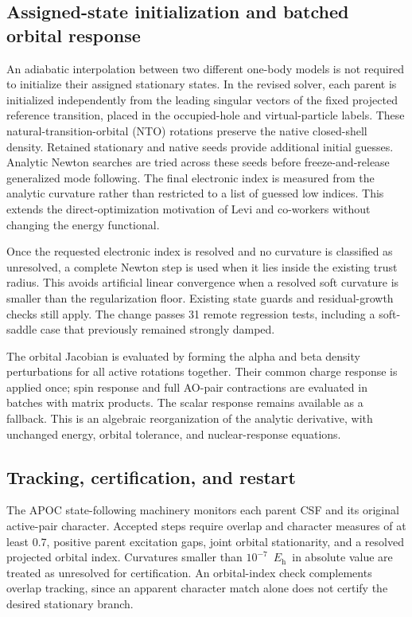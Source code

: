 \documentclass[11pt,a4paper]{article}
\newcommand{\Eh}{\ensuremath{E_{\mathrm h}}}
\begin{document}
\subsection{Assigned-state initialization and batched orbital response}
An adiabatic interpolation between two different one-body models is not required to initialize their assigned stationary states. In the revised solver, each parent is initialized independently from the leading singular vectors of the fixed projected reference transition, placed in the occupied-hole and virtual-particle labels. These natural-transition-orbital (NTO) rotations preserve the native closed-shell density. Retained stationary and native seeds provide additional initial guesses. Analytic Newton searches are tried across these seeds before freeze-and-release generalized mode following. The final electronic index is measured from the analytic curvature rather than restricted to a list of guessed low indices. This extends the direct-optimization motivation of Levi and co-workers without changing the energy functional.\cite{levi2020,gmf2023,freeze2026}

Once the requested electronic index is resolved and no curvature is classified as unresolved, a complete Newton step is used when it lies inside the existing trust radius. This avoids artificial linear convergence when a resolved soft curvature is smaller than the regularization floor. Existing state guards and residual-growth checks still apply. The change passes 31 remote regression tests, including a soft-saddle case that previously remained strongly damped.

The orbital Jacobian is evaluated by forming the alpha and beta density perturbations for all active rotations together. Their common charge response is applied once; spin response and full AO-pair contractions are evaluated in batches with matrix products. The scalar response remains available as a fallback. This is an algebraic reorganization of the analytic derivative, with unchanged energy, orbital tolerance, and nuclear-response equations.


\subsection{Tracking, certification, and restart}
The APOC state-following machinery monitors each parent CSF and its original active-pair character. Accepted steps require overlap and character measures of at least 0.7, positive parent excitation gaps, joint orbital stationarity, and a resolved projected orbital index. Curvatures smaller than $10^{-7}$~\Eh\ in absolute value are treated as unresolved for certification. An orbital-index check complements overlap tracking, since an apparent character match alone does not certify the desired stationary branch.
\end{document}
